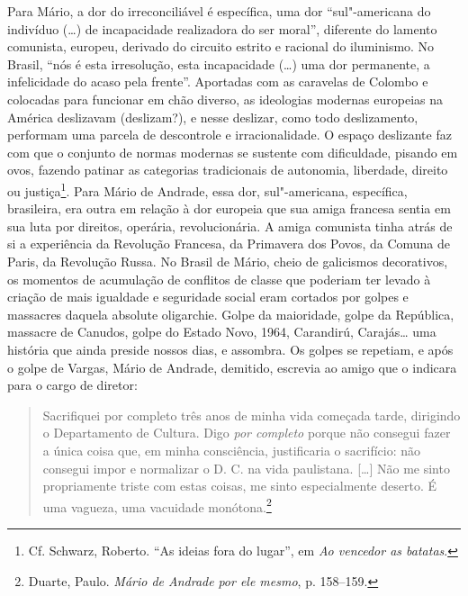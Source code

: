 Para Mário, a dor do irreconciliável é específica, uma dor
``sul"-americana do indivíduo (\ldots{}) de incapacidade realizadora do ser
moral'', diferente do lamento comunista, europeu, derivado do circuito
estrito e racional do iluminismo. No Brasil, ``nós é esta irresolução,
esta incapacidade (\ldots{}) uma dor permanente, a infelicidade do acaso pela
frente''. Aportadas com as caravelas de Colombo e colocadas para
funcionar em chão diverso, as ideologias modernas europeias na América
deslizavam (deslizam?), e nesse deslizar, como todo deslizamento,
performam uma parcela de descontrole e irracionalidade. O espaço
deslizante faz com que o conjunto de normas modernas se sustente com
dificuldade, pisando em ovos, fazendo patinar as categorias tradicionais
de autonomia, liberdade, direito ou justiça\footnote{Cf. Schwarz,
  Roberto. ``As ideias fora do lugar'', em \emph{Ao vencedor as
  batatas}.}. Para Mário de Andrade, essa dor, sul"-americana,
específica, brasileira, era outra em relação à dor europeia que sua
amiga francesa sentia em sua luta por direitos, operária,
revolucionária. A amiga comunista tinha atrás de si a experiência da
Revolução Francesa, da Primavera dos Povos, da Comuna de Paris, da
Revolução Russa. No Brasil de Mário, cheio de galicismos decorativos, os
momentos de acumulação de conflitos de classe que poderiam ter levado à
criação de mais igualdade e seguridade social eram cortados por golpes e
massacres daquela absolute oligarchie. Golpe da maioridade, golpe da
República, massacre de Canudos, golpe do Estado Novo, 1964, Carandirú,
Carajás\ldots{} uma história que ainda preside nossos dias, e assombra.
Os golpes se repetiam, e após o golpe de Vargas, Mário de Andrade,
demitido, escrevia ao amigo que o indicara para o cargo de diretor:

\begin{quote}
Sacrifiquei por completo três anos de minha vida começada tarde,
dirigindo o Departamento de Cultura. Digo \emph{por completo} porque não
consegui fazer a única coisa que, em minha consciência, justificaria o
sacrifício: não consegui impor e normalizar o D. C. na vida paulistana.
{[}\ldots{}{]} Não me sinto propriamente triste com estas coisas, me sinto
especialmente deserto. É uma vagueza, uma vacuidade monótona.\footnote{Duarte,
  Paulo. \emph{Mário de Andrade} \emph{por ele mesmo}, p. 158--159.}
\end{quote}

